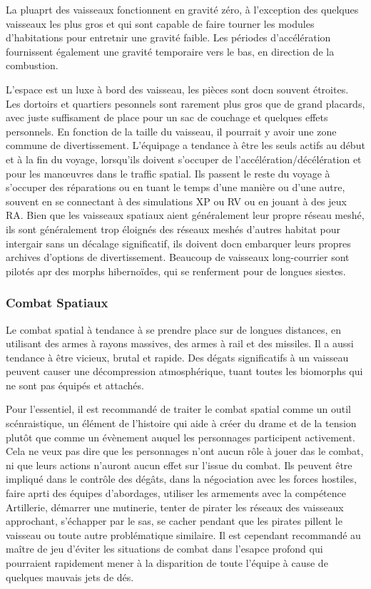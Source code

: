 La pluaprt des vaisseaux fonctionnent en gravité zéro, à l'exception des quelques vaisseaux les plus gros et qui sont capable de faire tourner les modules d'habitations pour entretnir une gravité faible. Les périodes d'accélération fournissent également une gravité temporaire vers le bas, en direction de la combustion. 

L'espace est un luxe à bord des vaisseau, les pièces sont docn souvent étroites. Les dortoirs et quartiers pesonnels sont rarement plus gros que de grand placards, avec juste suffisament de place pour un sac de couchage et quelques effets personnels. En fonction de la taille du vaisseau, il pourrait y avoir une zone commune de divertissement. L'équipage a tendance à être les seuls actifs au début et à la fin du voyage, lorsqu'ils doivent s'occuper de l'accélération/décélération et pour les manœuvres dans le traffic spatial. Ils passent le reste du voyage à s'occuper des réparations ou en tuant le temps d'une manière ou d'une autre, souvent en se connectant à des simulations XP ou RV ou en jouant à des jeux RA. Bien que les vaisseaux spatiaux aient généralement leur propre réseau meshé, ils sont généralement trop éloignés des réseaux meshés d'autres habitat pour intergair sans un décalage significatif, ils doivent docn embarquer leurs propres archives d'options de divertissement. Beaucoup de vaisseaux long-courrier sont pilotés apr des morphs hibernoïdes, qui se renferment pour de longues siestes. 

\subsubsection{Combat Spatiaux} 

Le combat spatial à tendance à se prendre place sur de longues distances, en utilisant des armes à rayons massives, des armes à rail et des missiles. Il a aussi tendance à être vicieux, brutal et rapide. Des dégats significatifs à un vaisseau peuvent causer une décompression atmosphérique, tuant toutes les biomorphs qui ne sont pas équipés et attachés. 

Pour l'essentiel, il est recommandé de traiter le combat spatial comme un outil scénraistique, un élément de l'histoire qui aide à créer du drame et de la tension plutôt que comme un évènement auquel les personnages participent activement. Cela ne veux pas dire que les personnages n'ont aucun rôle à jouer das le combat, ni que leurs actions n'auront aucun effet sur l'issue du combat. Ils peuvent être impliqué dans le contrôle des dégâts, dans la négociation avec les forces hostiles, faire aprti des équipes d'abordages, utiliser les armements avec la compétence Artillerie, démarrer une mutinerie, tenter de pirater les réseaux des vaisseaux approchant, s'échapper par le sas, se cacher pendant que les pirates pillent le vaisseau ou toute autre problématique similaire. Il est cependant recommandé au maître de jeu d'éviter les situations de combat dans l'esapce profond qui pourraient rapidement mener à la disparition de toute l'équipe à cause de quelques mauvais jets de dés. 

